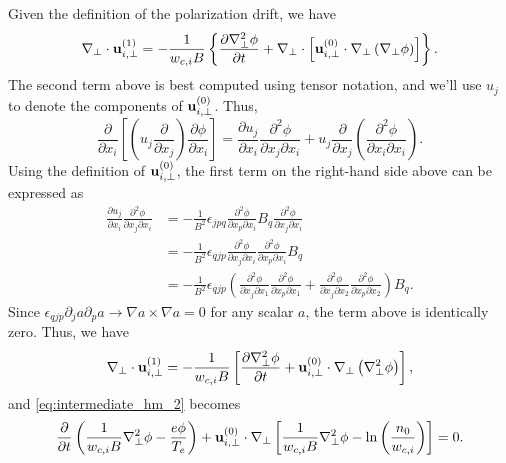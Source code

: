 \documentclass[11pt]{article}
\begin{document}
Given the definition of the polarization drift, we have
\begin{equation}
    \nabla_\perp \cdot \mathbf{u}_{i,\perp}^{(1)} = -\frac{1}{w_{c,i} B} \left \{ \frac{\partial \nabla_\perp^2 \phi}{\partial t} + \nabla_\perp \cdot \left [ \mathbf{u}_{i,\perp}^{(0)} \cdot \nabla_\perp \left ( \nabla_\perp \phi \right ) \right ] \right \}.
\end{equation}
The second term above is best computed using tensor notation, and we'll use $u_j$ to denote the components of $\mathbf{u}_{i,\perp}^{(0)}$. Thus,
\begin{equation}
    \frac{\partial}{\partial x_i} \left [ \left ( u_j \frac{\partial}{\partial x_j} \right) \frac{\partial \phi}{\partial x_i} \right ] = \frac{\partial u_j}{\partial x_i} \frac{\partial^2 \phi}{\partial x_j \partial x_i} + u_j \frac{\partial}{\partial x_j} \left (\frac{\partial^2 \phi}{\partial x_i \partial x_i} \right ).
\end{equation}
Using the definition of $\mathbf{u}_{i,\perp}^{(0)}$, the first term on the right-hand side above can be expressed as
\begin{align}
    \frac{\partial u_j}{\partial x_i} \frac{\partial^2 \phi}{\partial x_j \partial x_i} &= -\frac{1}{B^2} \epsilon_{jpq} \frac{\partial^2 \phi}{\partial x_p \partial x_i} B_q \frac{\partial^2 \phi}{\partial x_j \partial x_i} \nonumber \\
    &= -\frac{1}{B^2} \epsilon_{qjp} \frac{\partial^2 \phi}{\partial x_j \partial x_i} \frac{\partial^2 \phi}{\partial x_p \partial x_i} B_q  \nonumber \\
    &= -\frac{1}{B^2} \epsilon_{qjp} \left ( \frac{\partial^2 \phi}{\partial x_j \partial x_1} \frac{\partial^2 \phi}{\partial x_p \partial x_1} + \frac{\partial^2 \phi}{\partial x_j \partial x_2} \frac{\partial^2 \phi}{\partial x_p \partial x_2}  \right ) B_q.
\end{align}
Since $\epsilon_{qjp} \partial_j a \partial_p a \to \nabla a \times \nabla a = 0$ for any scalar $a$, the term above is identically zero. Thus, we have
\begin{equation}
    \label{eq:hm_divergence_polarization}
    \nabla_\perp \cdot \mathbf{u}_{i,\perp}^{(1)} = -\frac{1}{w_{c,i} B} \left [ \frac{\partial \nabla_\perp^2 \phi}{\partial t} + \mathbf{u}_{i,\perp}^{(0)} \cdot \nabla_\perp \left ( \nabla_\perp^2 \phi \right ) \right ],
\end{equation}
and \cref{eq:intermediate_hm_2} becomes
\begin{equation}
   \frac{\partial}{\partial t}\left ( \frac{1}{w_{c,i} B}\nabla_\perp^2 \phi - \frac{e \phi}{T_e} \right ) + \mathbf{u}_{i,\perp}^{(0)} \cdot \nabla_\perp \left [ \frac{1}{w_{c,i} B} \nabla_\perp^2 \phi - \ln \left( \frac{n_0}{w_{c,i}} \right) \right] = 0.
\end{equation}
\end{document}
